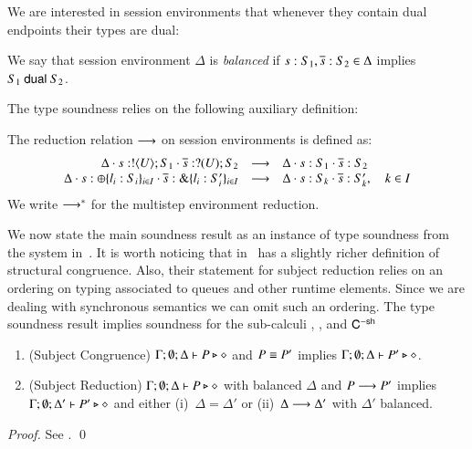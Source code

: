 We are interested in session environments that whenever they contain dual endpoints
their types are dual:
%
\begin{definition}\label{d:wtenv}\rm
	We say that session environment $\Delta$ is {\em balanced} if
	$s: S_1, \overline{s}: S_2 \in \Delta$ implies $S_1 \ \mathsf{dual}\  S_2$.
\end{definition}
%
The type soundness relies on the following auxiliary definition:
%
\begin{definition}\rm
	\label{def:ses_red}
	The reduction relation $\longrightarrow$ on session environments is defined as:
%
\[
	\begin{array}{rcl}
		\Delta \cdot s: ! \langle U \rangle ; S_1 \cdot \overline{s}: ? (U) ; S_2 &\longrightarrow& \Delta \cdot s: S_1 \cdot \overline{s}: S_2
		\\
		\Delta \cdot s: \oplus \{l_i: S_i\}_{i \in I} \cdot \overline{s}: \& \{l_i: S_i'\}_{i \in I} &\longrightarrow& \Delta \cdot s: S_k \cdot \overline{s}: S_k', \quad k \in I
	\end{array}
\]
%
	We write $\longrightarrow^\ast$ for the multistep environment reduction.
\end{definition}
%
We now state the main soundness result as an instance
of type soundness from the system in~\cite{tlca07}.
It is worth noticing that in~\cite{tlca07} has a slightly richer
definition of structural congruence.
Also, their statement for subject reduction relies on an
ordering on typing associated to queues and other 
runtime elements. %
Since we are dealing with synchronous semantics we can omit such an ordering.
The type soundness result implies soundness for the sub-calculi
\HO, \sessp, and $\mathsf{C}^{\mathsf{-sh}}$

\begin{theorem}\rm
	\label{thm:sr}
%
	\begin{enumerate}[1.]
		\item	(Subject Congruence)
			$\Gamma; \emptyset; \Delta \vdash P \triangleright \diamond$
			and
			$P \equiv P'$
			implies
			$\Gamma; \emptyset; \Delta \vdash P' \triangleright \diamond$.

		\item	(Subject Reduction)
			$\Gamma; \emptyset; \Delta \vdash P \triangleright \diamond$
			with
			balanced $\Delta$
			and
			$P \longrightarrow P'$
			implies $\Gamma; \emptyset; \Delta'  \vdash P' \triangleright \diamond$
			and either (i)~$\Delta = \Delta'$ or (ii)~$\Delta \longrightarrow \Delta'$
			with $\Delta'$ balanced.
	\end{enumerate}
\end{theorem}

\begin{proof}
	See .
	\qed
\end{proof}

